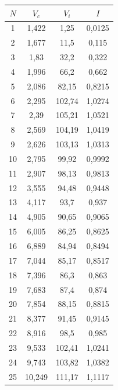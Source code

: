\documentclass[12pt]{article}
\begin{document}
\begin{figure}[h!]
\begin{minipage}[h]{0.49\linewidth}
        \end{minipage}
        \begin{minipage}[h]{0.49\linewidth}

          \begin{tabular}{ | c | c | c | c | }
            \hline
            $N$ & $V_c$ & $V_i$ & $I$ \\ \hline
            1 & 1,422 & 1,25 & 0,0125 \\
            2 & 1,677 & 11,5 & 0,115 \\
            3 & 1,83 & 32,2 & 0,322 \\
            4 & 1,996 & 66,2 & 0,662 \\
            5 & 2,086 & 82,15 & 0,8215 \\
            6 & 2,295 & 102,74 & 1,0274 \\
            7 & 2,39 & 105,21 & 1,0521 \\
            8 & 2,569 & 104,19 & 1,0419 \\
            9 & 2,626 & 103,13 & 1,0313 \\
            10 & 2,795 & 99,92 & 0,9992 \\
            11 & 2,907 & 98,13 & 0,9813 \\
            12 & 3,555 & 94,48 & 0,9448 \\
            13 & 4,117 & 93,7 & 0,937 \\
            14 & 4,905 & 90,65 & 0,9065 \\
            15 & 6,005 & 86,25 & 0,8625 \\
            16 & 6,889 & 84,94 & 0,8494 \\
            17 & 7,044 & 85,17 & 0,8517 \\
            18 & 7,396 & 86,3 & 0,863 \\
            19 & 7,683 & 87,4 & 0,874 \\
            20 & 7,854 & 88,15 & 0,8815 \\
            21 & 8,377 & 91,45 & 0,9145 \\
            22 & 8,916 & 98,5 & 0,985 \\
            23 & 9,533 & 102,41 & 1,0241 \\
            24 & 9,743 & 103,82 & 1,0382 \\
            25 & 10,249 & 111,17 & 1,1117 \\
            \hline
          \end{tabular}

          \vspace{2.52cm}
        \end{minipage}
        \label{table:static_method}
      \end{figure}
\end{document}
